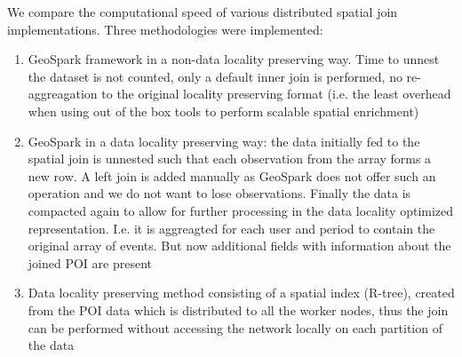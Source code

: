 \documentclass[conference]{IEEEtran}
\begin{document}
We compare the computational speed of various distributed spatial join implementations. Three methodologies were implemented: 
\begin{enumerate}
  \item GeoSpark framework in a non-data locality preserving way. Time to unnest the dataset is not counted, only a default inner join is performed, no re-aggreagation to the original locality preserving format (i.e. the least overhead when using out of the box tools to perform scalable spatial enrichment)
  \item GeoSpark in a data locality preserving way: the data initially fed to the spatial join is unnested such that each observation from the array forms a new row. A left join is added manually as GeoSpark does not offer such an operation and we do not want to lose observations. Finally the data is compacted again to allow for further processing in the data locality optimized representation. I.e. it is aggreagted for each user and period to contain the original array of events. But now additional fields with information about the joined POI are present
  \item Data locality preserving method consisting of a spatial index (R-tree), created from the POI data which is distributed to all the worker nodes, thus the join can be performed without accessing the network locally on each partition of the data
\end{enumerate}








\end{document}
